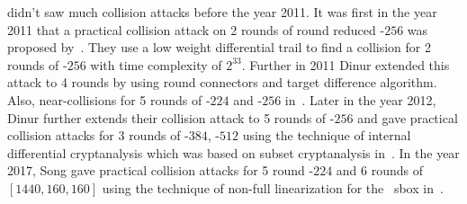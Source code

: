 \KECCAK{} didn't saw much collision attacks before the year 2011. It was first in the year 2011 that a practical collision attack on 2 rounds of round reduced \KECCAK-$256$ was proposed by~\cite{naya2011practical}. They use a low weight differential trail to find a collision for 2 rounds of \KECCAK-$256$ with time complexity of $2^{33}$. Further in 2011 Dinur \etal extended this attack to 4 rounds by using round connectors and target difference algorithm. Also, near-collisions for 5 rounds of \KECCAK-$224$ and \KECCAK-$256$ in~\cite{dinur2012new}. Later in the year 2012, Dinur \etal further extends their collision attack to 5 rounds of \KECCAK-$256$ and gave practical collision attacks for 3 rounds of \KECCAK-$384$, \KECCAK-$512$ using the technique of internal differential cryptanalysis which was based on subset cryptanalysis in~\cite{dinur2013collision}. In the year 2017, Song \etal gave practical collision attacks for 5 round \KECCAK-$224$ and 6 rounds of \KECCAK$[1440, 160, 160]$ using the technique of non-full linearization for the \KECCAK\ sbox in~\cite{song2017non}.

